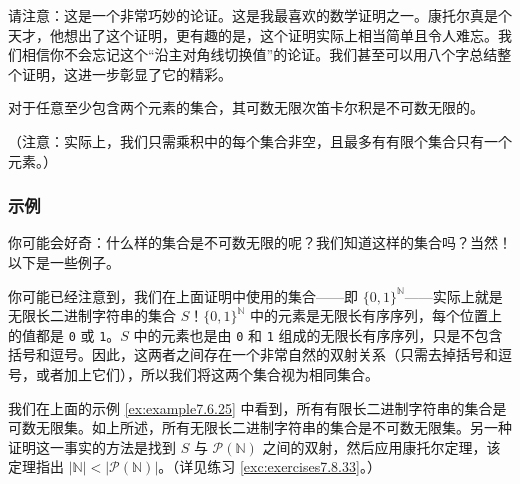 请注意：这是一个非常巧妙的论证。这是我最喜欢的数学证明之一。康托尔真是个天才，他想出了这个证明，更有趣的是，这个证明实际上相当简单且令人难忘。我们相信你不会忘记这个``沿主对角线切换值''的论证。我们甚至可以用八个字总结整个证明，这进一步彰显了它的精彩。

\begin{corollary}
    对于任意至少包含两个元素的集合，其可数无限次笛卡尔积是不可数无限的。
\end{corollary}
（注意：实际上，我们只需乘积中的每个集合非空，且最多有有限个集合只有一个元素。）

\subsubsection*{示例}

你可能会好奇：什么样的集合是不可数无限的呢？我们知道这样的集合吗？当然！以下是一些例子。\\

\begin{example}[所有无限长二进制字符串的集合]

    你可能已经注意到，我们在上面证明中使用的集合——即 $\{0, 1\}^\mathbb{N}$——实际上就是无限长二进制字符串的集合 $S$！$\{0, 1\}^\mathbb{N}$ 中的元素是无限长有序序列，每个位置上的值都是 \verb|0| 或 \verb|1|。$S$ 中的元素也是由 \verb|0| 和 \verb|1| 组成的无限长有序序列，只是不包含括号和逗号。因此，这两者之间存在一个非常自然的双射关系（只需去掉括号和逗号，或者加上它们），所以我们将这两个集合视为相同集合。

    我们在上面的示例 \ref{ex:example7.6.25} 中看到，所有有限长二进制字符串的集合是可数无限集。如上所述，所有无限长二进制字符串的集合是不可数无限集。另一种证明这一事实的方法是找到 $S$ 与 $\mathcal{P}(\mathbb{N})$ 之间的双射，然后应用康托尔定理，该定理指出 $|\mathbb{N}| < |\mathcal{P}(\mathbb{N})|$。（详见练习 \ref{exc:exercises7.8.33}。）
\end{example}

